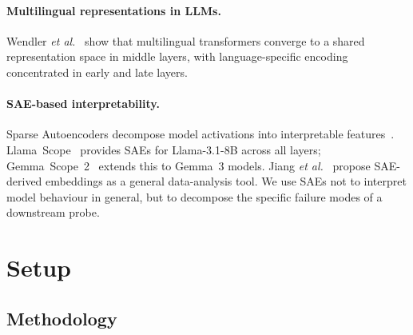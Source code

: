 \documentclass{article}
\newcommand{\etal}{\textit{et al.}\xspace}
\begin{document}
\paragraph{Multilingual representations in LLMs.}
Wendler \etal~\cite{wendler2024} show that multilingual transformers
converge to a shared representation space in middle layers, with
language-specific encoding concentrated in early and late layers.

\paragraph{SAE-based interpretability.}
Sparse Autoencoders decompose model activations into interpretable
features~\cite{bloom2024saelens}.
Llama~Scope~\cite{llamascope} provides SAEs for Llama-3.1-8B across all
layers; Gemma~Scope~2~\cite{gemma_scope2} extends this to
Gemma~3 models.
Jiang \etal~\cite{jiang2025} propose SAE-derived embeddings as a general
data-analysis tool.
We use SAEs not to interpret model behaviour in general, but to decompose
the specific failure modes of a downstream probe.

\section{Setup}
\label{sec:setup}

\subsection{Methodology}
\label{sec:methodology}
\end{document}
